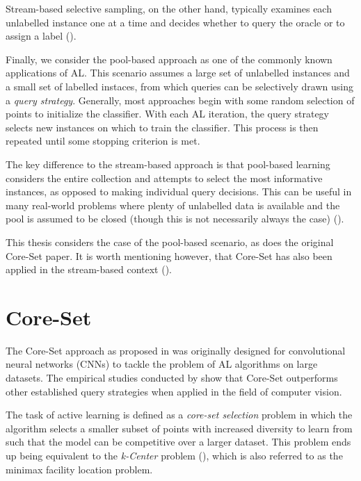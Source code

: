 \documentclass[english,bachelor,ul]{webisthesis} %
\begin{document}
Stream-based selective sampling, on the other hand, typically examines each unlabelled instance one at a time and decides whether to query the oracle or to assign a label (\cite{settles.tr09}).

Finally, we consider the pool-based approach as one of the commonly known applications of AL. This scenario assumes a large set of unlabelled instances and a small set of labelled instaces, from which queries can be selectively drawn using a \textit{query strategy}. Generally, most approaches begin with some random selection of points to initialize the classifier. With each AL iteration, the query strategy selects new instances on which to train the classifier. This process is then repeated until some stopping criterion is met. 

The key difference to the stream-based approach is that pool-based learning considers the entire collection and attempts to select the most informative instances, as opposed to making individual query decisions. This can be useful in many real-world problems where plenty of unlabelled data is available and the pool is assumed to be closed (though this is not necessarily always the case) (\cite{settles.tr09}).

This thesis considers the case of the pool-based scenario, as does the original Core-Set paper. It is worth mentioning however, that Core-Set has also been applied in the stream-based context (\cite{DBLP:conf/icml/SaranYK0A23}).

\section{Core-Set}

The Core-Set approach as proposed in \cite{DBLP:conf/iclr/SenerS18} was originally designed for convolutional neural networks (CNNs) to tackle the problem of AL algorithms on large datasets. The empirical studies conducted by \cite{DBLP:conf/iclr/SenerS18} show that Core-Set outperforms other established query strategies when applied in the field of computer vision.

The task of active learning is defined as a \textit{core-set selection} problem in which the algorithm selects a smaller subset of points with increased diversity to learn from such that the model can be competitive over a larger dataset. This problem ends up being equivalent to the \textit{k-Center} problem (\cite{DBLP:conf/iclr/SenerS18}), which is also referred to as the minimax facility location problem. 
\end{document}
